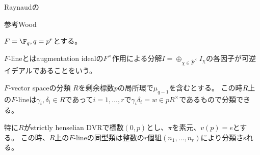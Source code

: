 Raynaudの

参考Wood

$F=\F_q, q=p^r$とする。

$F$-lineとはaugmentation idealの$F^\times$作用による分解$I=\oplus_{\chi\in\hat{F}^\times}I_\chi$の各因子が可逆イデアルであることをいう。

$F$-vector spaceの分類
$R$を剰余標数$p$の局所環で$\mu_{q-1}$を含むとする。
この時$R$上の$F$-lineは$\gamma_i, \delta_i\in R$であって$i=1,\ldots,r$で$\gamma_i\delta_i=w\in pR^\times$であるもので分類できる。

特に$R$がstrictly henselian DVRで標数$(0,p)$とし、$\pi$を素元、$v(p)=e$とする。
この時、$R$上の$F$-lineの同型類は整数の$r$個組$(n_1,\ldots,n_r)$により分類さsれる。
